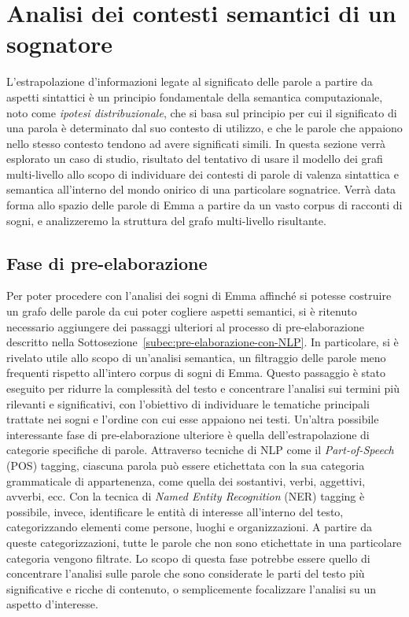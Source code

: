 \section{Analisi dei contesti semantici di un sognatore}\label{sec:analisi-dei-contesti-semantici-di-un-sognatore}

L'estrapolazione d'informazioni legate al significato delle parole a partire da aspetti sintattici \`e un
principio fondamentale della semantica computazionale, noto come \textit{ipotesi distribuzionale}, che si basa sul
principio per cui il significato di una parola \`e determinato dal suo contesto di utilizzo, e che le parole che
appaiono nello stesso contesto tendono ad avere significati simili.\newline
In questa sezione verrà esplorato un caso di studio, risultato del tentativo di usare il modello dei grafi multi-livello
allo scopo di individuare dei contesti di parole di valenza sintattica e semantica all'interno del mondo onirico
di una particolare sognatrice.
Verrà data forma allo spazio delle parole di Emma a partire da un vasto corpus di racconti di sogni, e analizzeremo la
struttura del grafo multi-livello risultante.

\subsection{Fase di pre-elaborazione}

Per poter procedere con l'analisi dei sogni di Emma affinché si potesse costruire un grafo delle parole
da cui poter cogliere aspetti semantici, si è ritenuto necessario aggiungere dei passaggi ulteriori
al processo di pre-elaborazione descritto nella Sottosezione~\ref{subec:pre-elaborazione-con-NLP}.
In particolare, si è rivelato utile allo scopo di un'analisi semantica,
un filtraggio delle parole meno frequenti rispetto all'intero corpus di sogni di Emma.
Questo passaggio è stato eseguito per ridurre la complessità del testo e concentrare l'analisi sui
termini più rilevanti e significativi, con l'obiettivo di individuare le tematiche principali trattate
nei sogni e l'ordine con cui esse appaiono nei testi.
Un'altra possibile interessante fase di pre-elaborazione ulteriore è quella dell'estrapolazione di categorie
specifiche di parole.
Attraverso tecniche di NLP come il \textit{Part-of-Speech} (POS) tagging, ciascuna parola può essere etichettata con la sua
categoria grammaticale di appartenenza, come quella dei sostantivi, verbi, aggettivi, avverbi, ecc.
Con la tecnica di \textit{Named Entity Recognition} (NER) tagging è possibile, invece, identificare le entità di interesse
all'interno del testo, categorizzando elementi come persone, luoghi e organizzazioni.
A partire da queste categorizzazioni, tutte le parole che non sono etichettate in una particolare
categoria vengono filtrate. Lo scopo di questa fase potrebbe essere quello di concentrare l'analisi sulle parole che
sono considerate le parti del testo più significative e ricche di contenuto, o semplicemente focalizzare l'analisi
su un aspetto d'interesse.


